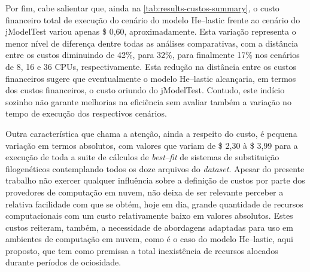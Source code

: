 \documentclass[english,brazilian]{UNISINOSmonografia} %
\begin{document}

Por fim, cabe salientar que, ainda na \autoref{tab:results-custos-summary}, o custo financeiro total de execução do cenário do modelo \textsf{He}--lastic frente ao cenário do jModelTest variou apenas \$ 0,60, aproximadamente.
%
Esta variação representa o menor nível de diferença dentre todas as análises comparativas, com a distância entre os custos diminuindo de 42\%, para 32\%, para finalmente 17\% nos cenários de 8, 16 e 36 CPUs, respectivamente.
%
Esta redução na distância entre os custos financeiros sugere que eventualmente o modelo \textsf{He}--lastic alcançaria, em termos dos custos financeiros, o custo oriundo do jModelTest.
%
Contudo, este indício sozinho não garante melhorias na eficiência sem avaliar também a variação no tempo de execução dos respectivos cenários.




Outra característica que chama a atenção, ainda a respeito do custo, é pequena variação em termos absolutos, com valores que variam de \$ 2,30 à  \$ 3,99 para a execução de toda a suite de cálculos de \textit{best--fit} de sistemas de substituição filogenéticos contemplando todos os doze arquivos do \textit{dataset}.
%
Apesar do presente trabalho não exercer qualquer influência sobre a definição de custos por parte dos provedores de computação em nuvem, não deixa de ser relevante perceber a relativa facilidade com que se obtém, hoje em dia, grande quantidade de recursos computacionais com um custo relativamente baixo em valores absolutos.
%
Estes custos reiteram, também, a necessidade de abordagens adaptadas para uso em ambientes de computação em nuvem, como é o caso do modelo \textsf{He}--lastic, aqui proposto, que tem como premissa a total inexistência de recursos alocados durante períodos de ociosidade.
\end{document}
